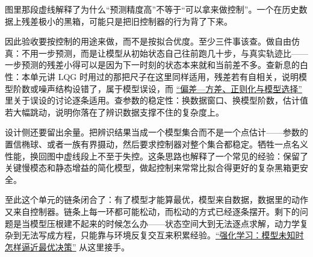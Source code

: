 图里那段虚线解释了为什么``预测精度高''不等于``可以拿来做控制''。一个在历史数据上残差极小的黑箱，可能只是把旧控制器的行为背了下来。

因此验收要按控制的用途来做，而不是按拟合优度。至少三件事该查。做自由仿真：不用一步预测，而是让模型从初始状态自己往前跑几十步，与真实轨迹比——一步预测的残差小得可以是因为下一时刻的状态本来就和当前差不多。查新息的白性：本单元讲 LQG 时用过的那把尺子在这里同样适用，残差若有自相关，说明模型阶数或噪声结构设错了，属于模型误设，而 \hyperref[sec:11-Mathematical-Statistics/06-Resampling-and-Model-Selection/04]{``偏差---方差、正则化与模型选择''} 里关于误设的讨论逐条适用。查参数的稳定性：换数据窗口、换模型阶数，估计值若大幅跳动，说明你落在了辨识数据支撑不住的复杂度上。

设计侧还要留出余量。把辨识结果当成一个模型集合而不是一个点估计——参数的置信椭球、或者一族有界摄动，然后要求控制器对整个集合都稳定。牺牲一点名义性能，换回图中虚线段上不至于失控。这条思路也解释了一个常见的经验：保留了关键慢模态和静态增益的简化模型，做起控制来常常比拟合得更好的复杂黑箱更安全。

至此这个单元的链条闭合了：有了模型才能算最优，模型来自数据，数据里的动作又来自控制器。链条上每一环都可能松动，而松动的方式已经逐条摆开。剩下的问题是当模型压根建不起来的时候怎么办——状态空间大到无法逐点求解，动力学复杂到无法写成方程，只能靠与环境反复交互来积累经验。\hyperref[ch:139]{``强化学习：模型未知时怎样逼近最优决策''} 从这里接手。
